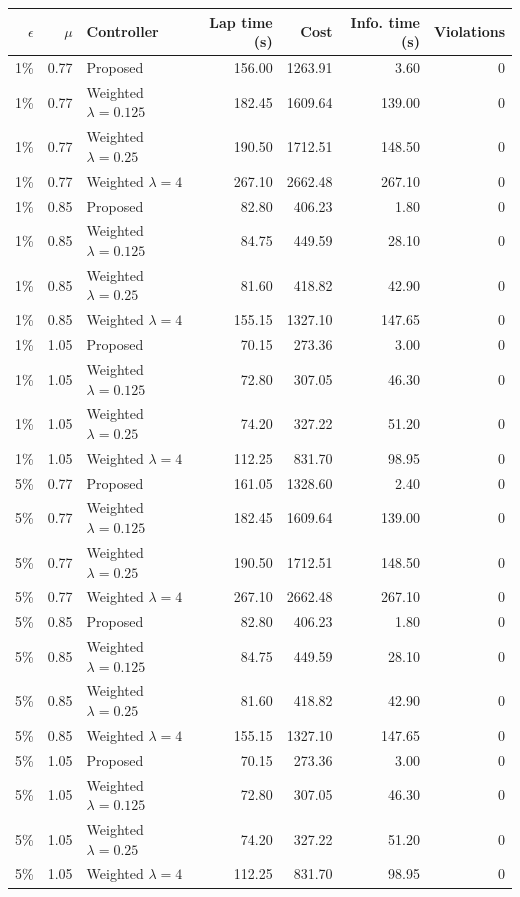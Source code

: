\begin{tabular}{rrlrrrr}
\hline
$\epsilon$ & $\mu$ & Controller & Lap time (s) & Cost & Info. time (s) & Violations \\
\hline
1\% & 0.77 & Proposed & 156.00 & 1263.91 & 3.60 & 0 \\
1\% & 0.77 & Weighted $\lambda=0.125$ & 182.45 & 1609.64 & 139.00 & 0 \\
1\% & 0.77 & Weighted $\lambda=0.25$ & 190.50 & 1712.51 & 148.50 & 0 \\
1\% & 0.77 & Weighted $\lambda=4$ & 267.10 & 2662.48 & 267.10 & 0 \\
1\% & 0.85 & Proposed & 82.80 & 406.23 & 1.80 & 0 \\
1\% & 0.85 & Weighted $\lambda=0.125$ & 84.75 & 449.59 & 28.10 & 0 \\
1\% & 0.85 & Weighted $\lambda=0.25$ & 81.60 & 418.82 & 42.90 & 0 \\
1\% & 0.85 & Weighted $\lambda=4$ & 155.15 & 1327.10 & 147.65 & 0 \\
1\% & 1.05 & Proposed & 70.15 & 273.36 & 3.00 & 0 \\
1\% & 1.05 & Weighted $\lambda=0.125$ & 72.80 & 307.05 & 46.30 & 0 \\
1\% & 1.05 & Weighted $\lambda=0.25$ & 74.20 & 327.22 & 51.20 & 0 \\
1\% & 1.05 & Weighted $\lambda=4$ & 112.25 & 831.70 & 98.95 & 0 \\
5\% & 0.77 & Proposed & 161.05 & 1328.60 & 2.40 & 0 \\
5\% & 0.77 & Weighted $\lambda=0.125$ & 182.45 & 1609.64 & 139.00 & 0 \\
5\% & 0.77 & Weighted $\lambda=0.25$ & 190.50 & 1712.51 & 148.50 & 0 \\
5\% & 0.77 & Weighted $\lambda=4$ & 267.10 & 2662.48 & 267.10 & 0 \\
5\% & 0.85 & Proposed & 82.80 & 406.23 & 1.80 & 0 \\
5\% & 0.85 & Weighted $\lambda=0.125$ & 84.75 & 449.59 & 28.10 & 0 \\
5\% & 0.85 & Weighted $\lambda=0.25$ & 81.60 & 418.82 & 42.90 & 0 \\
5\% & 0.85 & Weighted $\lambda=4$ & 155.15 & 1327.10 & 147.65 & 0 \\
5\% & 1.05 & Proposed & 70.15 & 273.36 & 3.00 & 0 \\
5\% & 1.05 & Weighted $\lambda=0.125$ & 72.80 & 307.05 & 46.30 & 0 \\
5\% & 1.05 & Weighted $\lambda=0.25$ & 74.20 & 327.22 & 51.20 & 0 \\
5\% & 1.05 & Weighted $\lambda=4$ & 112.25 & 831.70 & 98.95 & 0 \\
\hline
\end{tabular}
